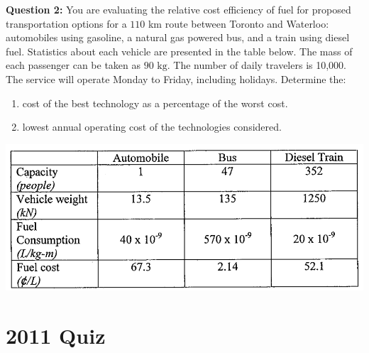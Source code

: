 \documentclass{article}
\begin{document}
\newpage
\textbf{Question 2:} You are evaluating the relative cost efficiency of fuel for proposed transportation options for a $110$ km route between Toronto and Waterloo: automobiles using gasoline, a natural gas powered bus, and a train using diesel fuel. Statistics about each vehicle are presented in the table below. The mass of each passenger can be taken as $90 \text{ kg}$. The number of daily travelers is 10,000. The service will operate Monday to Friday, including holidays. Determine the:
\begin{enumerate}
    \item cost of the best technology as a percentage of the worst cost.
    \item lowest annual operating cost of the technologies considered.
\end{enumerate}
\begin{center}
    \includegraphics[width=0.8\linewidth]{2009-3-2.png}
\end{center}

\newpage
\section*{2011 Quiz}
\end{document}
